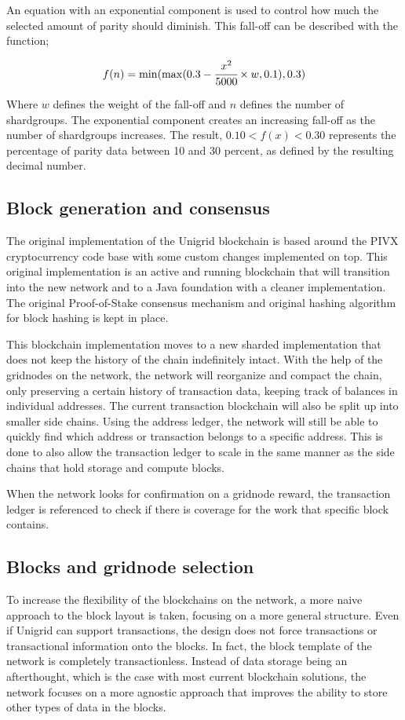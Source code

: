 \documentclass[10pt,a4paper,final]{article}
\begin{document}
\noindent An equation with an exponential component is used to control how much the selected amount of parity should diminish. This fall-off can be described with the function;

\[
	\begin{array}{l}
	f(n) = \min(\max(0.3 - \cfrac{x^2}{5000} \times w, 0.1), 0.3)
	\end{array}	
\]

\noindent Where $w$ defines the weight of the fall-off and $n$ defines the number of shardgroups. The exponential component creates an increasing fall-off as the number of \glspl{shardgroup} increases. The result, $0.10 < f(x) < 0.30$ represents the percentage of parity data between 10 and 30 percent, as defined by the resulting decimal number.

\subsection{Block generation and consensus}
The original implementation of the Unigrid blockchain is based around the PIVX cryptocurrency \cite{pivxrepo} code base with some custom changes implemented on top. This original implementation is an active and running blockchain that will transition into the new network and to a Java foundation with a cleaner implementation. The original Proof-of-Stake \cite{sothe2018} consensus mechanism and original hashing algorithm for block hashing is kept in place.

This blockchain implementation moves to a new sharded implementation that does not keep the history of the chain indefinitely intact. With the help of the \glspl{gridnode} on the network, the network will reorganize and compact the chain, only preserving a certain history of transaction data, keeping track of balances in individual addresses. The current transaction blockchain will also be split up into smaller side chains. Using the address ledger, the network will still be able to quickly find which address or transaction belongs to a specific address. This is done to also allow the transaction ledger to scale in the same manner as the side chains that hold storage and compute blocks.

\noindent When the network looks for confirmation on a \gls{gridnode} reward, the transaction ledger is referenced to check if there is coverage for the work that specific block contains.

\subsection{Blocks and \gls{gridnode} selection}
\label{section:blocks}
To increase the flexibility of the blockchains on the network, a more naive approach to the block layout is taken, focusing on a more general structure. Even if Unigrid can support transactions, the design does not force transactions or transactional information onto the blocks. In fact, the block template of the network is completely transactionless. Instead of data storage being an afterthought, which is the case with most current blockchain solutions, the network focuses on a more agnostic approach that improves the ability to store other types of data in the blocks.
\end{document}
